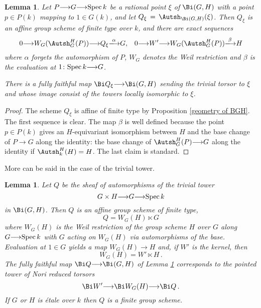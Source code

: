 \documentclass[12pt,reqno]{amsart}
\theoremstyle{plain}
\newtheorem{lem}[thm]{Lemma}
\theoremstyle{definition}
\numberwithin{thm}{section}
\newcounter{x}\setcounter{x}{1}
\theoremstyle{plain}
\begin{document}
\begin{lem}\label{automorphisms of a generic tower}
Let $P{\longrightarrow} G {\longrightarrow} {{\rm Spec \,}} k$ be a rational point $\xi$ of $\Bi(G,H)$ with a point
$p\in P(k)$ mapping to $1\in G(k)$, and let $Q_\xi\,=\,\Autsh_{\Bi(G,H)}(\xi)$. Then
$Q_\xi$ is an affine group scheme of finite type over $k$, and there are exact sequences
 \[
 0{\longrightarrow} W_G(\Autsh^H_G(P)) {\longrightarrow} Q_\xi {\xlongrightarrow{\alpha}} G{,\ } \ \ 0{\longrightarrow}
W' {\longrightarrow} W_G(\Autsh^H_G(P)) {\xlongrightarrow{\beta}} H
 \]
 where $\alpha$ forgets the automorphism of $P$, $W_G$ denotes the Weil
restriction and $\beta$ is the evaluation at $1\colon {{\rm Spec \,}} k {\longrightarrow} G$.
 
 There is a fully faithful map $\Bi Q_\xi {\longrightarrow} \Bi(G,H)$ sending the trivial torsor
to $\xi$ and whose image consist of the towers locally isomorphic to $\xi$.
\end{lem}

\begin{proof}
The scheme $Q_\xi$ is affine of finite type by Proposition \ref{geometry of BGH}.
The first sequence is clear. The map $\beta$ is well defined because the point
$p\in P(k)$ gives an $H$-equivariant isomorphism between $H$ and the base change of
$P{\longrightarrow} G$ along the identity: the base change of $\Autsh^H_G(P) {\longrightarrow} G$ along the
identity if $\Autsh^H_k(H)=H$. The last claim is standard.
\end{proof}

More can be said in the case of the trivial tower.

\begin{lem}\label{automorphisms of the trivial tower}
 Let $Q$ be the sheaf of automorphisms of the trivial tower $$G\times H{\longrightarrow} G{\longrightarrow}
{{\rm Spec \,}} k$$ in $\Bi(G,H)$. Then $Q$ is an affine group scheme of finite type,
 \[
 Q=W_G(H)\ltimes G
 \]
 where $W_G(H)$ is the Weil restriction of the group scheme $H$ over $G$ along $G{\longrightarrow} 
{{\rm Spec \,}} k$ with $G$ acting on $W_G(H)$ via automorphisms of the base. Evaluation at
$1\in G$ yields a map $W_G(H){\longrightarrow} H$ and, if $W'$ is the kernel, then
 \[
 W_G(H)= W' \ltimes H\, .
 \]
 The fully faithful map $\Bi Q{\longrightarrow} \Bi(G,H)$ of Lemma \ref{automorphisms of a generic tower} corresponds to the pointed tower of Nori reduced torsors
 \[
 \Bi W' {\longrightarrow} \Bi W_G(H) {\longrightarrow} \Bi Q\, .
 \]
If $G$ or $H$ is \'etale over $k$ then $Q$ is a finite group scheme.
\end{lem}
\end{document}
